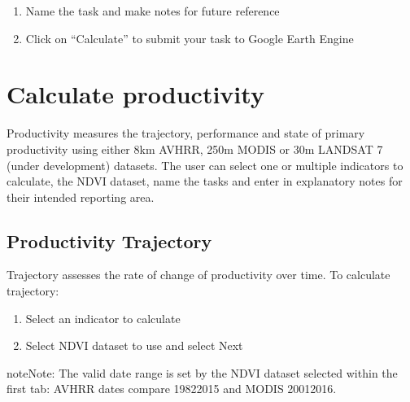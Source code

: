 \documentclass[letterpaper,10pt,english]{sphinxmanual}
\begin{document}
\begin{enumerate}
%
\setcounter{enumi}{5}
\item {} 
\sphinxAtStartPar
Name the task and make notes for future reference

\item {} 
\sphinxAtStartPar
Click on “Calculate” to submit your task to Google Earth Engine

\end{enumerate}



\section{Calculate productivity}
\label{\detokenize{Qgis_Plugin/Calculate_sdg15:calculate-productivity}}
\sphinxAtStartPar
Productivity measures the trajectory, performance and state of primary
productivity using either 8km AVHRR, 250m MODIS or 30m LANDSAT 7 (under development) datasets. The user can select
one or multiple indicators to calculate, the NDVI dataset, name the tasks and
enter in explanatory notes for their intended reporting area.


\subsection{Productivity Trajectory}
\label{\detokenize{Qgis_Plugin/Calculate_sdg15:productivity-trajectory}}
\sphinxAtStartPar
Trajectory assesses the rate of change of productivity over time. To calculate
trajectory:
\begin{enumerate}
%
\item {} 
\sphinxAtStartPar
Select an indicator to calculate

\item {} 
\sphinxAtStartPar
Select NDVI dataset to use and select Next

\end{enumerate}

\begin{sphinxadmonition}{note}{Note:}
\sphinxAtStartPar
The valid date range is set by the NDVI dataset selected within the first
tab: AVHRR dates compare 1982\sphinxhyphen{}2015 and MODIS 2001\sphinxhyphen{}2016.
\end{sphinxadmonition}
\end{document}
